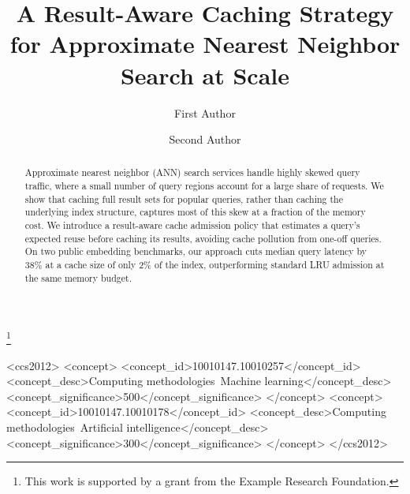 \documentclass[acmsmall]{acmart}
\begin{document}
\title[A Caching Strategy for Approximate Nearest Neighbor Search]{A Result-Aware Caching Strategy for Approximate Nearest Neighbor Search at Scale}

\author{First Author}

\author{Second Author}

\thanks{This work is supported by a grant from the Example Research Foundation.}

\begin{abstract}
Approximate nearest neighbor (ANN) search services handle highly skewed query traffic, where a small number of query regions account for a large share of requests. We show that caching full result sets for popular queries, rather than caching the underlying index structure, captures most of this skew at a fraction of the memory cost. We introduce a result-aware cache admission policy that estimates a query's expected reuse before caching its results, avoiding cache pollution from one-off queries. On two public embedding benchmarks, our approach cuts median query latency by 38\% at a cache size of only 2\% of the index, outperforming standard LRU admission at the same memory budget.
\end{abstract}

\begin{CCSXML}
<ccs2012>
<concept>
<concept_id>10010147.10010257</concept_id>
<concept_desc>Computing methodologies~Machine learning</concept_desc>
<concept_significance>500</concept_significance>
</concept>
<concept>
<concept_id>10010147.10010178</concept_id>
<concept_desc>Computing methodologies~Artificial intelligence</concept_desc>
<concept_significance>300</concept_significance>
</concept>
</ccs2012>
\end{CCSXML}


\maketitle

\renewcommand{\shortauthors}{First Author and Second Author}
\end{document}
